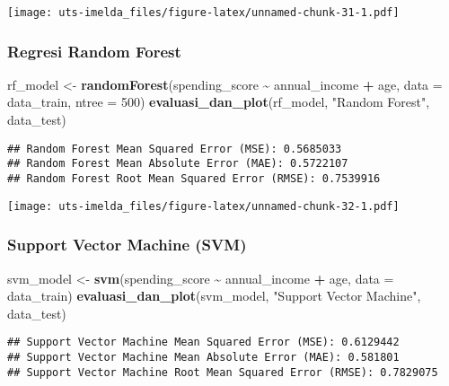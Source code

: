 \documentclass[
]{article}
\newenvironment{Shaded}{\begin{snugshade}}{\end{snugshade}}
\newcommand{\AttributeTok}[1]{\textcolor[rgb]{0.13,0.29,0.53}{#1}}
\newcommand{\DecValTok}[1]{\textcolor[rgb]{0.00,0.00,0.81}{#1}}
\newcommand{\FunctionTok}[1]{\textcolor[rgb]{0.13,0.29,0.53}{\textbf{#1}}}
\newcommand{\NormalTok}[1]{#1}
\newcommand{\OtherTok}[1]{\textcolor[rgb]{0.56,0.35,0.01}{#1}}
\newcommand{\SpecialCharTok}[1]{\textcolor[rgb]{0.81,0.36,0.00}{\textbf{#1}}}
\newcommand{\StringTok}[1]{\textcolor[rgb]{0.31,0.60,0.02}{#1}}
\begin{document}
\texttt{[image: uts-imelda\_files/figure-latex/unnamed-chunk-31-1.pdf]}

\hypertarget{regresi-random-forest}{%
\subsubsection{Regresi Random Forest}\label{regresi-random-forest}}

\begin{Shaded}
\begin{Highlighting}[]
\NormalTok{rf\_model }\OtherTok{\textless{}{-}} \FunctionTok{randomForest}\NormalTok{(spending\_score }\SpecialCharTok{\textasciitilde{}}\NormalTok{ annual\_income }\SpecialCharTok{+}\NormalTok{ age, }\AttributeTok{data =}\NormalTok{ data\_train, }\AttributeTok{ntree =} \DecValTok{500}\NormalTok{)}
\FunctionTok{evaluasi\_dan\_plot}\NormalTok{(rf\_model, }\StringTok{"Random Forest"}\NormalTok{, data\_test)}
\end{Highlighting}
\end{Shaded}

\begin{verbatim}
## Random Forest Mean Squared Error (MSE): 0.5685033 
## Random Forest Mean Absolute Error (MAE): 0.5722107 
## Random Forest Root Mean Squared Error (RMSE): 0.7539916
\end{verbatim}

\texttt{[image: uts-imelda\_files/figure-latex/unnamed-chunk-32-1.pdf]}

\hypertarget{support-vector-machine-svm}{%
\subsubsection{Support Vector Machine
(SVM)}\label{support-vector-machine-svm}}

\begin{Shaded}
\begin{Highlighting}[]
\NormalTok{svm\_model }\OtherTok{\textless{}{-}} \FunctionTok{svm}\NormalTok{(spending\_score }\SpecialCharTok{\textasciitilde{}}\NormalTok{ annual\_income }\SpecialCharTok{+}\NormalTok{ age, }\AttributeTok{data =}\NormalTok{ data\_train)}
\FunctionTok{evaluasi\_dan\_plot}\NormalTok{(svm\_model, }\StringTok{"Support Vector Machine"}\NormalTok{, data\_test)}
\end{Highlighting}
\end{Shaded}

\begin{verbatim}
## Support Vector Machine Mean Squared Error (MSE): 0.6129442 
## Support Vector Machine Mean Absolute Error (MAE): 0.581801 
## Support Vector Machine Root Mean Squared Error (RMSE): 0.7829075
\end{verbatim}
\end{document}
